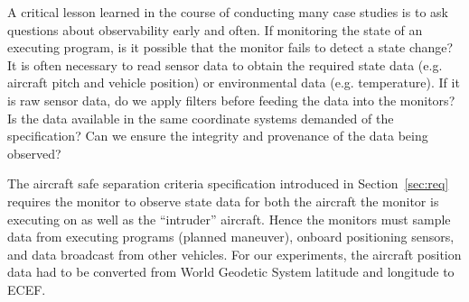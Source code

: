 A critical lesson learned in the course of conducting many case studies
is to ask questions about observability early and often. 
If monitoring the state of an executing program, is it possible that
the monitor fails to detect a state change?  It is often necessary to
read sensor data to obtain the required state data (e.g. aircraft
pitch and vehicle position) or environmental data (e.g. temperature).
If it is raw sensor data, do we apply filters before feeding the data
into the monitors?  Is the data available in the same coordinate
systems demanded of the specification?  Can we ensure the integrity
and provenance of the data being observed? 


  The aircraft safe separation criteria specification introduced in
  Section~\ref{sec:req} requires the monitor to  observe state data for
  both the aircraft the monitor is executing on as well as the
  ``intruder'' aircraft.  Hence the monitors must sample data from
  executing programs (planned maneuver), onboard positioning sensors,
  and data broadcast from other vehicles.  For our experiments, the
  aircraft position data had to be converted from World Geodetic
  System latitude and longitude to ECEF.


